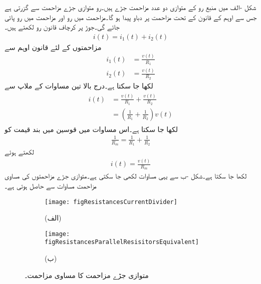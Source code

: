 شکل -الف میں منبع رو  کے متوازی دو عدد مزاحمت جڑے ہیں۔رو  متوازی جڑے مزاحمت سے گزرتی ہے جس سے اوہم کے قانون کے تحت مزاحمت پر دباو  پیدا ہو گا۔مزاحمت  میں رو  اور مزاحمت  میں رو  پائی جائے گی۔جوڑ  پر کرچاف قانون رو لکھتے ہیں۔
\begin{align}\label{مساوات_مزاحمتی_تقسیم_رو_الف}
i(t)=i_1(t)+i_2(t)
\end{align}
مزاحمتوں کے لئے قانون اوہم سے
\begin{align}\label{مساوات_مزاحمتی_تقسیم_رو_ب}
i_1(t)&=\frac{v(t)}{R_1}\\
i_2(t)&=\frac{v(t)}{R_2}
\end{align}
لکھا جا سکتا ہے۔درج بالا تین مساوات کے ملاپ سے
\begin{gather}
\begin{aligned}\label{مساوات_مزاحمتی_تقسیم_رو_پ}
i(t)&=\frac{v(t)}{R_1}+\frac{v(t)}{R_2}\\
&=\left(\frac{1}{R_1}+\frac{1}{R_2}\right) v(t)
\end{aligned}
\end{gather}
لکھا جا سکتا ہے۔اس مساوات میں قوسین میں بند قیمت کو
\begin{align}\label{مساوات_مزاحمتی_متوازی_مساوی}
\frac{1}{R_m}=\frac{1}{R_1}+\frac{1}{R_2}
\end{align}
لکھتے ہوئے
\begin{align}\label{مساوات_مزاحمتی_دباو_اور_مساوی_مزاحمت_برابر_دباو}
i(t)=\frac{v(t)}{R_m}
\end{align}
لکھا جا سکتا ہے۔شکل -ب سے یہی مساوات لکھی جا سکتی ہے۔متوازی جڑے مزاحمتوں کی مساوی مزاحمت مساوات  سے حاصل ہوتی ہے۔
\begin{figure}
\centering
\begin{subfigure}{0.5\textwidth}
\centering
\texttt{[image: figResistancesCurrentDivider]}
\caption*{(الف)}
\end{subfigure}%
\begin{subfigure}{0.5\textwidth}
\centering
\texttt{[image: figResistancesParallelResisitorsEquivalent]}
\caption*{(ب)}
\end{subfigure}%
\caption{متوازی جڑے مزاحمت کا مساوی مزاحمت۔}
\label{شکل_مزاحمتی_متوازی_جڑے_پرزوں_میں_تقسیم_رو}
\end{figure}

